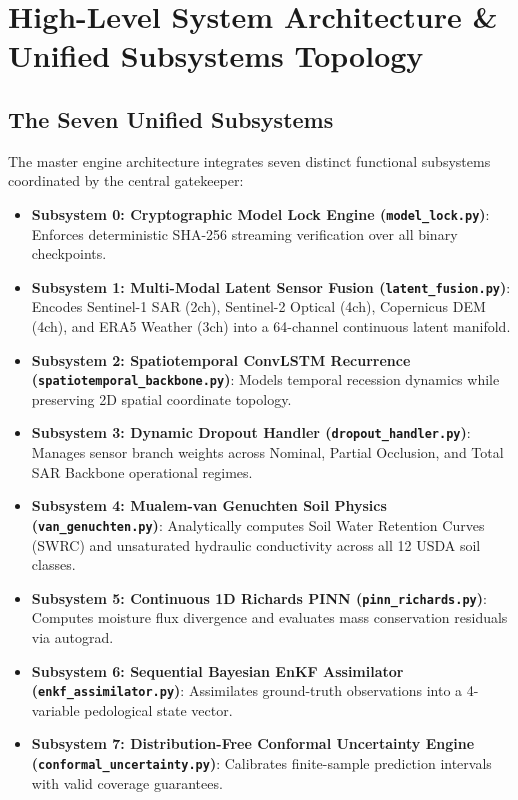 \documentclass[11pt,a4paper]{article}
\theoremstyle{definition}
\theoremstyle{remark}
\begin{document}
\section{High-Level System Architecture \& Unified Subsystems Topology}

\subsection{The Seven Unified Subsystems}
The master engine architecture integrates seven distinct functional subsystems coordinated by the central gatekeeper:
\begin{itemize}
    \item \textbf{Subsystem 0: Cryptographic Model Lock Engine (\texttt{model\_lock.py})}: Enforces deterministic SHA-256 streaming verification over all binary checkpoints.
    \item \textbf{Subsystem 1: Multi-Modal Latent Sensor Fusion (\texttt{latent\_fusion.py})}: Encodes Sentinel-1 SAR (2ch), Sentinel-2 Optical (4ch), Copernicus DEM (4ch), and ERA5 Weather (3ch) into a 64-channel continuous latent manifold.
    \item \textbf{Subsystem 2: Spatiotemporal ConvLSTM Recurrence (\texttt{spatiotemporal\_backbone.py})}: Models temporal recession dynamics while preserving 2D spatial coordinate topology.
    \item \textbf{Subsystem 3: Dynamic Dropout Handler (\texttt{dropout\_handler.py})}: Manages sensor branch weights across Nominal, Partial Occlusion, and Total SAR Backbone operational regimes.
    \item \textbf{Subsystem 4: Mualem-van Genuchten Soil Physics (\texttt{van\_genuchten.py})}: Analytically computes Soil Water Retention Curves (SWRC) and unsaturated hydraulic conductivity across all 12 USDA soil classes.
    \item \textbf{Subsystem 5: Continuous 1D Richards PINN (\texttt{pinn\_richards.py})}: Computes moisture flux divergence and evaluates mass conservation residuals via autograd.
    \item \textbf{Subsystem 6: Sequential Bayesian EnKF Assimilator (\texttt{enkf\_assimilator.py})}: Assimilates ground-truth observations into a 4-variable pedological state vector.
    \item \textbf{Subsystem 7: Distribution-Free Conformal Uncertainty Engine (\texttt{conformal\_uncertainty.py})}: Calibrates finite-sample prediction intervals with valid coverage guarantees.
\end{itemize}
\end{document}
